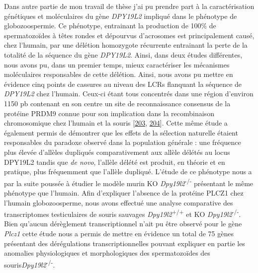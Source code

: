 \documentclass[12pt,a4paper,twoside]{ugathesis}
\theoremstyle{definition}
\theoremstyle{definition}
\theoremstyle{definition}
\theoremstyle{remark}
\begin{document}
Dans autre partie de mon travail de thèse j'ai pu prendre part à la
caractérisation génétiques et moléculaires du gène \emph{DPY19L2}
impliqué dans le phénotype de globozoospermie. Ce phénotype, entrainant
la production de 100\% de spermatozoïdes à têtes rondes et dépourvus
d'acrosomes est principalement causé, chez l'humain, par une délétion
homozygote récurrente entrainant la perte de la totalité de la séquence
du gène \emph{DPY19L2}. Ainsi, dans deux études différentes, nous avons
pu, dans un premier temps, mieux caractériser les mécanismes
moléculaires responsables de cette délétion. Ainsi, nous avons pu mettre
en évidence cinq points de cassures au niveau des LCRs flanquant la
séquence de \emph{DPY19L2} chez l'humain. Ceux-ci étant tous concentrés
dans une région d'environ 1150 pb contenant en son centre un site de
reconnaissance consensus de la protéine PRDM9 connue pour son
implication dans la recombinaison chromosomique chez l'humain et la
souris {[}\protect\hyperlink{ref-Parvanov2010}{203},
\protect\hyperlink{ref-Baudat2010}{204}{]}. Cette même étude a également
permis de démontrer que les effets de la sélection naturelle étaient
responsables du paradoxe observé dans la population générale : une
fréquence plus élevée d'allèles dupliqués comparativement aux allèle
délétés au locus DPY19L2 tandis que \emph{de novo}, l'allèle délété est
produit, en théorie et en pratique, plus fréquemment que l'allèle
dupliqué. L'étude de ce phénotype nous a par la suite poussée à étudier
le modèle murin KO \emph{Dpy19l2}\textsuperscript{-/-} présentant le
même phénotype que l'humain. Afin d'expliquer l'absence de la protéine
PLCZ1 chez l'humain globozoosperme, nous avons effectué une analyse
comparative des transcriptomes testiculaires de souris sauvages
\emph{Dpy19l2}\textsuperscript{+/+} et KO
\emph{Dpy19l2}\textsuperscript{-/-}. Bien qu'aucun dérèglement
transcriptionnel n'ait pu être observé pour le gène \emph{Plcz1} cette
étude nous a permis de mettre en évidence un total de 75 gènes
présentant des dérégulations transcriptionnelles pouvant expliquer en
partie les anomalies physiologiques et morphologiques des spermatozoïdes
des souris\emph{Dpy19l2}\textsuperscript{-/-}.
\end{document}
